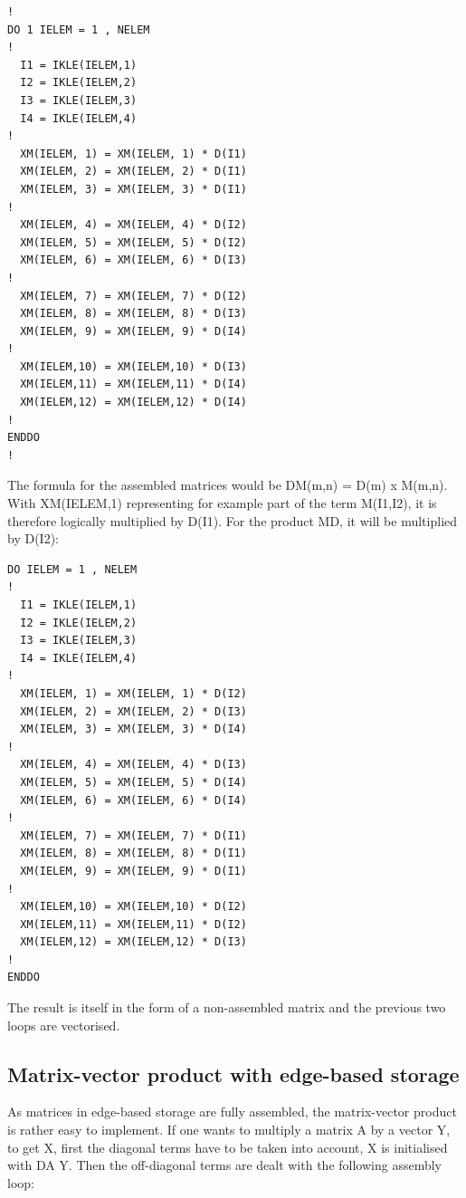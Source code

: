 
\begin{lstlisting}[language=TelFortran]
!
DO 1 IELEM = 1 , NELEM
!
  I1 = IKLE(IELEM,1)
  I2 = IKLE(IELEM,2)
  I3 = IKLE(IELEM,3)
  I4 = IKLE(IELEM,4)
!
  XM(IELEM, 1) = XM(IELEM, 1) * D(I1)
  XM(IELEM, 2) = XM(IELEM, 2) * D(I1)
  XM(IELEM, 3) = XM(IELEM, 3) * D(I1)
!
  XM(IELEM, 4) = XM(IELEM, 4) * D(I2)
  XM(IELEM, 5) = XM(IELEM, 5) * D(I2)
  XM(IELEM, 6) = XM(IELEM, 6) * D(I3)
!
  XM(IELEM, 7) = XM(IELEM, 7) * D(I2)
  XM(IELEM, 8) = XM(IELEM, 8) * D(I3)
  XM(IELEM, 9) = XM(IELEM, 9) * D(I4)
!
  XM(IELEM,10) = XM(IELEM,10) * D(I3)
  XM(IELEM,11) = XM(IELEM,11) * D(I4)
  XM(IELEM,12) = XM(IELEM,12) * D(I4)
!
ENDDO
!
\end{lstlisting}

The formula for the assembled matrices would be DM(m,n) = D(m) x M(m,n). With
XM(IELEM,1) representing for example part of the term M(I1,I2), it is therefore
logically multiplied by D(I1). For the product MD, it will be multiplied by
D(I2):


\begin{lstlisting}[language=TelFortran]
DO IELEM = 1 , NELEM
!
  I1 = IKLE(IELEM,1)
  I2 = IKLE(IELEM,2)
  I3 = IKLE(IELEM,3)
  I4 = IKLE(IELEM,4)
!
  XM(IELEM, 1) = XM(IELEM, 1) * D(I2)
  XM(IELEM, 2) = XM(IELEM, 2) * D(I3)
  XM(IELEM, 3) = XM(IELEM, 3) * D(I4)
!
  XM(IELEM, 4) = XM(IELEM, 4) * D(I3)
  XM(IELEM, 5) = XM(IELEM, 5) * D(I4)
  XM(IELEM, 6) = XM(IELEM, 6) * D(I4)
!
  XM(IELEM, 7) = XM(IELEM, 7) * D(I1)
  XM(IELEM, 8) = XM(IELEM, 8) * D(I1)
  XM(IELEM, 9) = XM(IELEM, 9) * D(I1)
!
  XM(IELEM,10) = XM(IELEM,10) * D(I2)
  XM(IELEM,11) = XM(IELEM,11) * D(I2)
  XM(IELEM,12) = XM(IELEM,12) * D(I3)
!
ENDDO
\end{lstlisting}

The result is itself in the form of a non-assembled matrix and the previous two
loops are vectorised.

\subsection{Matrix-vector product with edge-based storage}

As matrices in edge-based storage are fully assembled, the matrix-vector
product is rather easy to implement. If one wants to multiply a matrix A by a
vector Y, to get X, first the diagonal terms have to be taken into account, X
is initialised with DA Y. Then the off-diagonal terms are dealt with the
following assembly loop:

